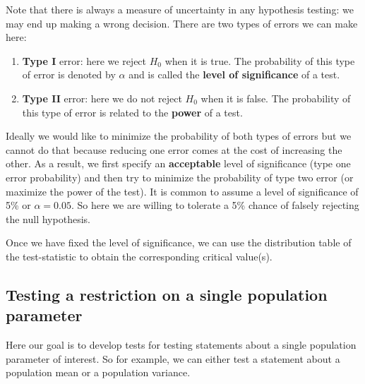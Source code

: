 \documentclass[
]{book}
\theoremstyle{definition}
\theoremstyle{definition}
\theoremstyle{definition}
\theoremstyle{definition}
\theoremstyle{remark}
\begin{document}
Note that there is always a measure of uncertainty in any hypothesis testing: we may end up making a wrong decision. There are two types of errors we can make here:

\begin{enumerate}
\def\labelenumi{\arabic{enumi}.}
\item
  \textbf{Type I} error: here we reject \(H_0\) when it is true. The probability of this type of error is denoted by \(\alpha\) and is called the \textbf{level of significance} of a test.
\item
  \textbf{Type II} error: here we do not reject \(H_0\) when it is false. The probability of this type of error is related to the \textbf{power} of a test.
\end{enumerate}

Ideally we would like to minimize the probability of both types of errors but we cannot do that because reducing one error comes at the cost of increasing the other. As a result, we first specify an \textbf{acceptable} level of significance (type one error probability) and then try to minimize the probability of type two error (or maximize the power of the test). It is common to assume a level of significance of 5\% or \(\alpha=0.05\). So here we are willing to tolerate a 5\% chance of falsely rejecting the null hypothesis.

Once we have fixed the level of significance, we can use the distribution table of the test-statistic to obtain the corresponding critical value(s).

\hypertarget{testing-a-restriction-on-a-single-population-parameter}{%
\subsection{Testing a restriction on a single population parameter}\label{testing-a-restriction-on-a-single-population-parameter}}

Here our goal is to develop tests for testing statements about a single population parameter of interest. So for example, we can either test a statement about a population mean or a population variance.
\end{document}

